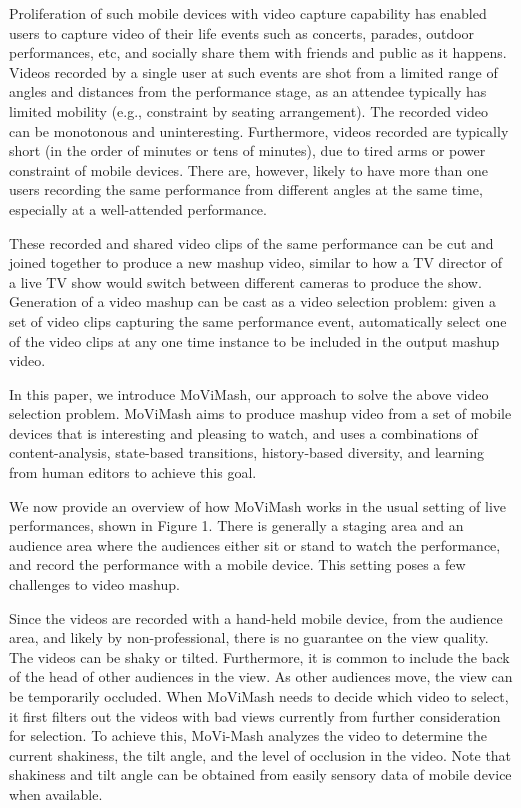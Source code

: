 \documentclass{sig-alternate-05-2015}
\begin{document}
Proliferation of such mobile devices with video capture capability has enabled users to capture video of their life events such as concerts, parades, outdoor performances, etc, and socially share them with friends and public as it happens. Videos recorded by a single user at such events are shot from a limited range of angles and distances from the performance stage, as an attendee typically has limited mobility (e.g., constraint by seating arrangement). The recorded video can be monotonous and uninteresting. Furthermore, videos recorded are typically short (in the order of minutes or tens of minutes), due to tired arms or power constraint of mobile devices. There are, however, likely to have more than one users recording the same performance from different angles at the same time, especially at a well-attended performance.

These recorded and shared video clips of the same performance can be cut and joined together to produce a new mashup video, similar to how a TV director of a live TV show would switch between different cameras to produce the show. Generation of a video mashup can be cast as a video selection problem: given a set of video clips capturing the same performance event, automatically select one of the video clips at any one time instance to be included in the output mashup video.

In this paper, we introduce MoViMash, our approach to solve the above video selection problem. MoViMash aims to produce mashup video from a set of mobile devices that is interesting and pleasing to watch, and uses a combinations of content-analysis, state-based transitions, history-based diversity, and learning from human editors to achieve this goal.

We now provide an overview of how MoViMash works in the usual setting of live performances, shown in Figure 1. There is generally a staging area and an audience area where the audiences either sit or stand to watch the performance, and record the performance with a mobile device. This setting poses a few challenges to video mashup.

Since the videos are recorded with a hand-held mobile device, from the audience area, and likely by non-professional, there is no guarantee on the view quality. The videos can be shaky or tilted. Furthermore, it is common to include the back of the head of other audiences in the view. As other audiences move, the view can be temporarily occluded. When MoViMash needs to decide which video to select, it first filters out the videos with bad views currently from further consideration for selection. To achieve this, MoVi-Mash analyzes the video to determine the current shakiness, the tilt angle, and the level of occlusion in the video. Note that shakiness and tilt angle can be obtained from easily sensory data of mobile device when available.
\end{document}
